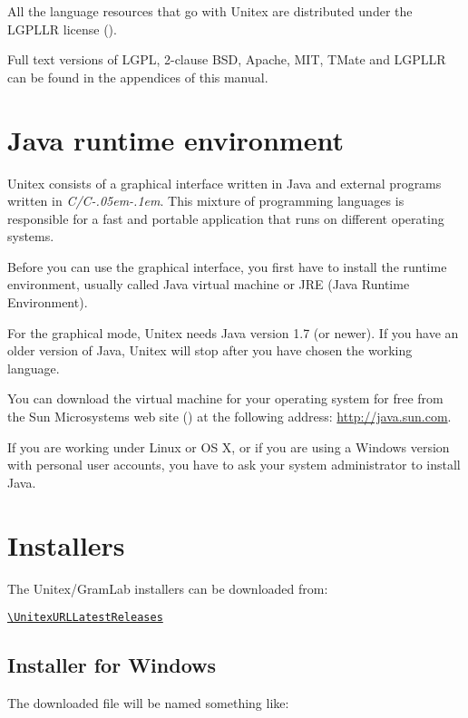 \bigskip
\noindent All the language resources that go with Unitex are distributed under the LGPLLR
license  (\cite{LGPLLR}).

\bigskip
\noindent Full text versions of LGPL, 2-clause BSD, Apache, MIT, TMate and LGPLLR can be found in
the appendices of this manual.

\section{Java runtime environment}
Unitex consists of a graphical interface written in Java and external programs
written in \textit{C/C\kern-.05em\raisebox{.5ex}{++}\kern-.1em}. This mixture of
programming languages is responsible for a fast and portable application that
runs on different operating systems.

\bigskip
\noindent Before you can use the graphical interface, you first have to install the runtime
environment, usually called Java virtual machine  or
JRE (Java Runtime Environment).

\bigskip
\noindent For the graphical mode, Unitex needs Java version 1.7 (or newer). If you have an
older version of Java, Unitex will stop after you have chosen the working language.

\bigskip
\noindent You can download the virtual machine for your operating system for free from the
Sun Microsystems web site (\cite{site-java}) at the following address:
\url{http://java.sun.com}.

\bigskip
\noindent If you are working under Linux or OS X, or if you are using a Windows version
with personal user accounts, you have to ask your system administrator to install Java.

\section{Installers}
\begin{samepage}
The Unitex/GramLab installers can be downloaded from:

\begin{center}
{\tt\url{\UnitexURLLatestReleases}}
\end{center}
\end{samepage}

\subsection{Installer for Windows}
The downloaded file will be named something like:

